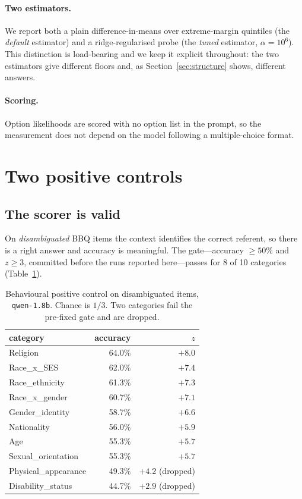 \documentclass{article}
\begin{document}
\paragraph{Two estimators.} We report both a plain difference-in-means over
extreme-margin quintiles (the \emph{default} estimator) and a ridge-regularised
probe (the \emph{tuned} estimator, $\alpha{=}10^{6}$). This distinction is
load-bearing and we keep it explicit throughout: the two estimators give
different floors and, as Section~\ref{sec:structure} shows, different answers.

\paragraph{Scoring.} Option likelihoods are scored with no option list in the
prompt, so the measurement does not depend on the model following a
multiple-choice format.

\section{Two positive controls}

\subsection{The scorer is valid}

On \emph{disambiguated} BBQ items the context identifies the correct referent,
so there is a right answer and accuracy is meaningful. The gate---accuracy
$\geq 50\%$ and $z \geq 3$, committed before the runs reported here---passes for 8 of 10
categories (Table~\ref{tab:posctrl}).

\begin{table}[h]
\centering
\caption{Behavioural positive control on disambiguated items, \texttt{qwen-1.8b}.
Chance is $1/3$. Two categories fail the pre-fixed gate and are dropped.}
\label{tab:posctrl}
\begin{tabular}{lrr}
\toprule
category & accuracy & $z$ \\
\midrule
Religion             & 64.0\% & $+8.0$ \\
Race\_x\_SES         & 62.0\% & $+7.4$ \\
Race\_ethnicity      & 61.3\% & $+7.3$ \\
Race\_x\_gender      & 60.7\% & $+7.1$ \\
Gender\_identity     & 58.7\% & $+6.6$ \\
Nationality          & 56.0\% & $+5.9$ \\
Age                  & 55.3\% & $+5.7$ \\
Sexual\_orientation  & 55.3\% & $+5.7$ \\
\midrule
Physical\_appearance & 49.3\% & $+4.2$ \quad(dropped) \\
Disability\_status   & 44.7\% & $+2.9$ \quad(dropped) \\
\bottomrule
\end{tabular}
\end{table}
\end{document}
